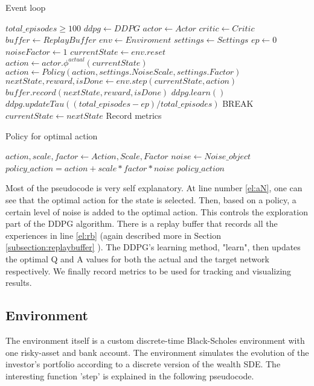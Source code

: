 \begin{algorithm}
\caption{Event loop}\label{alg:eventloop}
\begin{algorithmic}[1]
\Require $total\_episodes \geq 100$
\State $ddpg \gets DDPG$
\State $actor \gets Actor $
\State $critic \gets Critic$
\State $buffer \gets ReplayBuffer$
\State $env \gets Enviroment$
\State $settings \gets Settings$
\State $ep \gets 0$
\State $noiseFactor \gets 1$
    \State $currentState \gets env.reset$
    \State $action \gets actor.\phi^{actual} (currentState)$ \label{el:aN}
    \State $action \gets Policy(action,settings.NoiseScale,settings.Factor)$ 
    \State $nextState,reward,isDone \gets env.step(currentState,action)$ \label{el:rb}
    \State $buffer.record (nextState,reward,isDone) $
    \State  $ddpg.learn()$
        \State $ddpg.updateTau((total\_episodes-ep)/total\_episodes)$
    \EndIf
        \State BREAK
    \EndIf
     \State $currentState \gets nextState$
    \State Record metrics
    \EndWhile
\EndWhile

\end{algorithmic}
\end{algorithm}
\begin{algorithm}
    \caption{Policy for optimal action}\label{alg:policy}
    \begin{algorithmic}[1]
    \Require
        \Statex $action,scale,factor \gets Action,Scale,Factor$
    \Statex
        \State $noise \gets Noise\_object$ 
        \State  $policy\_action = action + scale*factor*noise$
        \State \Return $policy\_action$ 
    \end{algorithmic}
\end{algorithm}

Most of the pseudocode is very self explanatory. At line number \ref{el:aN}, one can see that the optimal action for the state is selected. Then, based on a policy, a certain level of noise is added to the optimal action. This controls the exploration part of the DDPG algorithm. There is a replay buffer that records all the experiences in line \ref{el:rb} (again described more in Section  \ref{subsection:replaybuffer} ). The DDPG's learning method, "learn",  then updates the optimal Q and A values for both the actual and the target network respectively. We finally record metrics to be used for tracking and visualizing results.


\subsection{Environment}
The environment itself is a custom discrete-time Black-Scholes environment with one risky-asset and bank account. The environment simulates the evolution of the investor's portfolio according to
a discrete version of the wealth SDE. The interesting function 'step' is explained in the following pseudocode.

